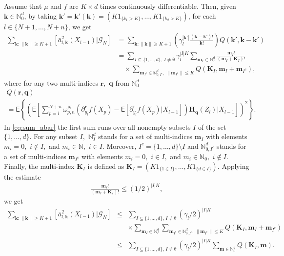 \documentclass[bj]{imsart}
\begin{document}
Assume that $\mu$ and $f$ are $K\times d$ times continuously differentiable.
Then, given $\mathbf k\in\mathbb N_0^d$,
by taking $\mathbf k'= \mathbf k'(\mathbf k)
=(K1_{\{k_1>K\}},\ldots,K1_{\{k_d>K\}})$,
for each $l\in\{N+1,\ldots,N+n\}$, we get
\begin{align}
\label{eq:sum_abar}
\sum_{\mathbf{k}\colon\|\mathbf{k}\|\geq K+1}\left[\bar{a}_{l,\mathbf{k}}^{2}(X_{l-1})|\mathcal{G}_{N}\right] & =\sum_{\mathbf{k}\colon\|\mathbf{k}\|\geq K+1}\left(\gamma_{l}^{|\mathbf{k}'|}\frac{(\mathbf{k}-\mathbf{k}')!}{\mathbf{k}!}\right)Q(\mathbf{k}',\mathbf{k}-\mathbf{k}')\\
\nonumber
 & =\sum_{I\subseteq\{1,\ldots,d\},\, I\neq \emptyset}\gamma_{l}^{|I|K}\sum_{\mathbf{m}_{I}\in\mathbb{N}_{I}^{d}}\frac{\mathbf{m}_{I}!}{\left(\mathbf{m}_{I}+\mathbf{K}_{I}\right)!}
 \\
 \nonumber
 & \hspace{1em}\times\sum_{\mathbf{m}_{I^c}\in \mathbb{N}^d_{0,I^c},\,\|\mathbf{m}_{I^c}\|\leq K}Q(\mathbf{\mathbf{K}}_{I},\mathbf{m}_{I}+\mathbf{m}_{I^c}),
\end{align}
where for any two multi-indices \(\mathbf{r},\) \(\mathbf{q}\) from \(\mathbb{N}_0^d\)
\begin{multline*}
Q(\mathbf{r},\mathbf{q})
\\
=\mathsf{E}\left\{
\left(\mathsf{E}\left[\sum_{p=l}^{N+n}\omega_{p,n}^{N}\left(\partial_{y_{l}}^{\mathbf r}f\left(X_{p}\right)-\mathsf{E}\left[\partial_{y_{l}}^{\mathbf r}f\left(X_{p}\right)|X_{l-1}\right]\right)\mathbf{H}_{\mathbf{q}}(Z_{l})\Big|X_{l-1}\right]\right)^{2}
\right\}.
\end{multline*}
In \eqref{eq:sum_abar} the first sum runs over all nonempty subsets $I$ of the set $\{1,\ldots,d\}.$
For any subset $I,$ $\mathbb{N}_{I}^{d}$ stands for a set
of multi-indices $\mathbf{m}_{I}$ with elements $m_{i}=0,$ $i\not\in I,$
and $m_{i}\in\mathbb{N},$  $i\in I.$ Moreover, \(I^c=\{1,\ldots,d\}\setminus I\) and \(\mathbb{N}^d_{0,I^c}\) stands for a set
of multi-indices $\mathbf{m}_{I^c}$ with elements $m_{i}=0,$ $i\in I,$
and $m_{i}\in\mathbb{N}_0,$  $i\not\in I.$ Finally, the multi-index \(\mathbf{K}_I\) is defined as $\mathbf{\mathbf{K}}_{I}=(K1_{\{1\in I\}},\ldots,K1_{\{d\in I\}}).$
Applying the estimate
\begin{eqnarray*}
\frac{\mathbf{m}_{I}!}{\left(\mathbf{m}_{I}+\mathbf{K}_{I}\right)!}\leq (1/2)^{|I| K},
\end{eqnarray*}
we get
\begin{eqnarray*}
\sum_{\mathbf{k}\colon\|\mathbf{k}\|\geq K+1}\left[\bar{a}_{l,\mathbf{k}}^{2}(X_{l-1})|\mathcal{G}_{N}\right]&\leq &
\sum_{I\subseteq\{1,\ldots,d\},\, I\neq \emptyset} (\gamma_{l}/2)^{|I|K}
\\
&& \times\sum_{\mathbf{m}_{I}\in\mathbb{N}_{I}^{d}} \sum_{\mathbf{m}_{I^c}\in \mathbb{N}^d_{0,I^c},\,\|\mathbf{m}_{I^c}\|\leq K} Q(\mathbf{\mathbf{K}}_{I},\mathbf{m}_{I}+\mathbf{m}_{I^c})
\\
&\leq &
\sum_{I\subseteq\{1,\ldots,d\},\, I\neq \emptyset} (\gamma_{l}/2)^{|I|K} \sum_{\mathbf{m}\in\mathbb{N}_0^{d}} Q(\mathbf{\mathbf{K}}_{I},\mathbf{m}).
\end{eqnarray*}
\end{document}
